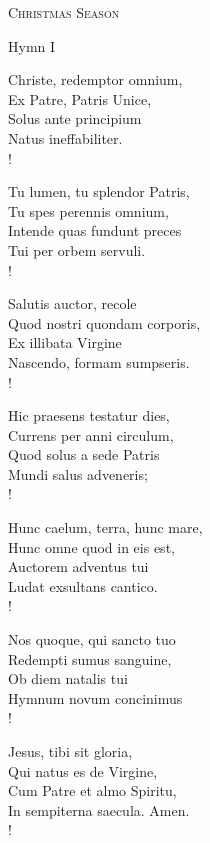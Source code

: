 \begin{center}\noindent\textsc{\small{Christmas Season}}\end{center}

Hymn I
\begin{cverse}
Christe, redemptor omnium,\\
Ex Patre, Patris Unice,\\
Solus ante principium\\
Natus ineffabiliter.\\!

Tu lumen, tu splendor Patris,\\
Tu spes perennis omnium,\\
Intende quas fundunt preces\\
Tui per orbem servuli.\\!

Salutis auctor, recole\\
Quod nostri quondam corporis,\\
Ex illibata Virgine\\
Nascendo, formam sumpseris.\\!

Hic praesens testatur dies,\\
Currens per anni circulum,\\
Quod solus a sede Patris\\
Mundi salus adveneris;\\!

Hunc caelum, terra, hunc mare,\\
Hunc omne quod in eis est,\\
Auctorem adventus tui\\
Ludat exsultans cantico.\\!

Nos quoque, qui sancto tuo\\
Redempti sumus sanguine,\\
Ob diem natalis tui\\
Hymnum novum concinimus\\!

Jesus, tibi sit gloria,\\
Qui natus es de Virgine,\\
Cum Patre et almo Spiritu,\\
In sempiterna saecula. Amen.\\!
\end{cverse}

